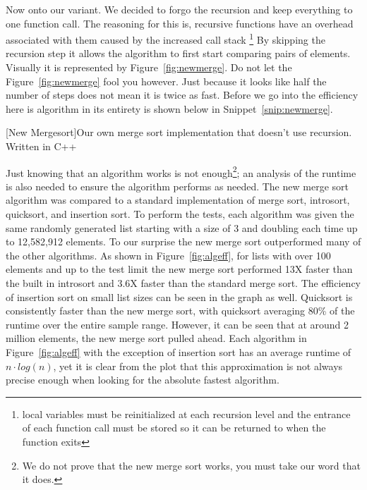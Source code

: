 \documentclass[12pt]{article}
\begin{document}
	Now onto our variant.
	We decided to forgo the recursion and keep everything to one function call.
	The reasoning for this is, recursive functions have an overhead associated with them caused by the increased call stack \footnote{local variables must be reinitialized at each recursion level and the entrance of each function call must be stored so it can be returned to when the function exits}
	By skipping the recursion step it allows the algorithm to first start comparing pairs of elements.
	Visually it is represented by Figure~\ref{fig:newmerge}.
	Do not let the Figure~\ref{fig:newmerge} fool you however.
	Just because it looks like half the number of steps does not mean it is twice as fast.
	Before we go into the efficiency here is algorithm in its entirety is shown below in Snippet~\ref{snip:newmerge}.
	
	\begin{center}
		[New Mergesort]{Our own merge sort implementation that doesn't use recursion. Written in C++}
		
		\label{snip:newmerge}
	\end{center}

	Just knowing that an algorithm works is not enough\footnote{We do not prove that the new merge sort works, you must take our word that it does.}; an analysis of the runtime is also needed to ensure the algorithm performs as needed.
	The new merge sort algorithm was compared to a standard implementation of merge sort, introsort, quicksort, and insertion sort.
	To perform the tests, each algorithm was given the same randomly generated list starting with a size of 3 and doubling each time up to 12,582,912 elements.
	To our surprise the new merge sort outperformed many of the other algorithms.
	As shown in Figure~\ref{fig:algeff}, for lists with over 100 elements and up to the test limit the new merge sort performed 13X faster than the built in introsort and 3.6X faster than the standard merge sort.
	The efficiency of insertion sort on small list sizes can be seen in the graph as well.
	Quicksort is consistently faster than the new merge sort, with quicksort averaging 80\% of the runtime over the entire sample range.
	However, it can be seen that at around 2 million elements, the new merge sort pulled ahead.
	Each algorithm in Figure~\ref{fig:algeff} with the exception of insertion sort has an average runtime of $n \cdot log (n)$, yet it is clear from the plot that this approximation is not always precise enough when looking for the absolute fastest algorithm.
\end{document}
